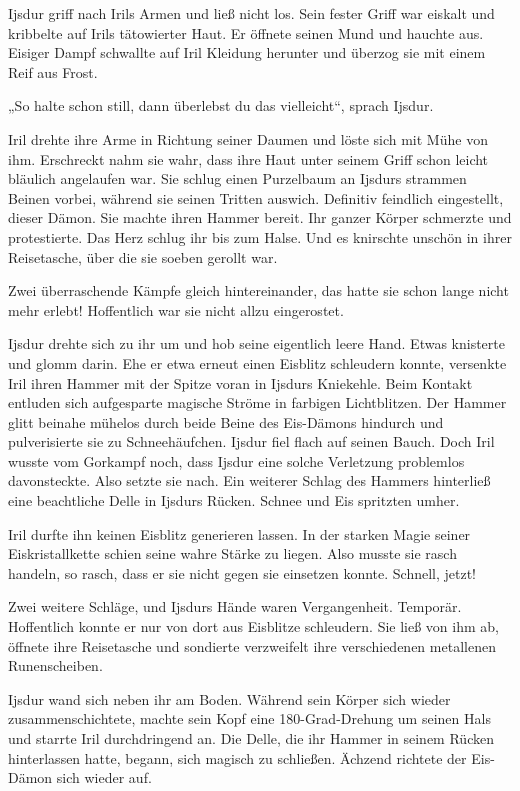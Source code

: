 Ijsdur griff nach Irils Armen und ließ nicht los. Sein fester Griff war eiskalt und kribbelte auf Irils tätowierter Haut. Er öffnete seinen Mund und hauchte aus. Eisiger Dampf schwallte auf Iril Kleidung herunter und überzog sie mit einem Reif aus Frost.

„So halte schon still, dann überlebst du das vielleicht“, sprach Ijsdur.

Iril drehte ihre Arme in Richtung seiner Daumen und löste sich mit Mühe von ihm. Erschreckt nahm sie wahr, dass ihre Haut unter seinem Griff schon leicht bläulich angelaufen war. Sie schlug einen Purzelbaum an Ijsdurs strammen Beinen vorbei, während sie seinen Tritten auswich. Definitiv feindlich eingestellt, dieser Dämon. Sie machte ihren Hammer bereit. Ihr ganzer Körper schmerzte und protestierte. Das Herz schlug ihr bis zum Halse. Und es knirschte unschön in ihrer Reisetasche, über die sie soeben gerollt war.

Zwei überraschende Kämpfe gleich hintereinander, das hatte sie schon lange nicht mehr erlebt! Hoffentlich war sie nicht allzu eingerostet.

Ijsdur drehte sich zu ihr um und hob seine eigentlich leere Hand. Etwas knisterte und glomm darin. Ehe er etwa erneut einen Eisblitz schleudern konnte, versenkte Iril ihren Hammer mit der Spitze voran in Ijsdurs Kniekehle. Beim Kontakt entluden sich aufgesparte magische Ströme in farbigen Lichtblitzen. Der Hammer glitt beinahe mühelos durch beide Beine des Eis-Dämons hindurch und pulverisierte sie zu Schneehäufchen. Ijsdur fiel flach auf seinen Bauch. Doch Iril wusste vom Gorkampf noch, dass Ijsdur eine solche Verletzung problemlos davonsteckte. Also setzte sie nach. Ein weiterer Schlag des Hammers hinterließ eine beachtliche Delle in Ijsdurs Rücken. Schnee und Eis spritzten umher.

Iril durfte ihn keinen Eisblitz generieren lassen. In der starken Magie seiner Eiskristallkette schien seine wahre Stärke zu liegen. Also musste sie rasch handeln, so rasch, dass er sie nicht gegen sie einsetzen konnte. Schnell, jetzt!

Zwei weitere Schläge, und Ijsdurs Hände waren Vergangenheit. Temporär. Hoffentlich konnte er nur von dort aus Eisblitze schleudern. Sie ließ von ihm ab, öffnete ihre Reisetasche und sondierte verzweifelt ihre verschiedenen metallenen Runenscheiben.

Ijsdur wand sich neben ihr am Boden. Während sein Körper sich wieder zusammenschichtete, machte sein Kopf eine 180-Grad-Drehung um seinen Hals und starrte Iril durchdringend an. Die Delle, die ihr Hammer in seinem Rücken hinterlassen hatte, begann, sich magisch zu schließen. Ächzend richtete der Eis-Dämon sich wieder auf.

